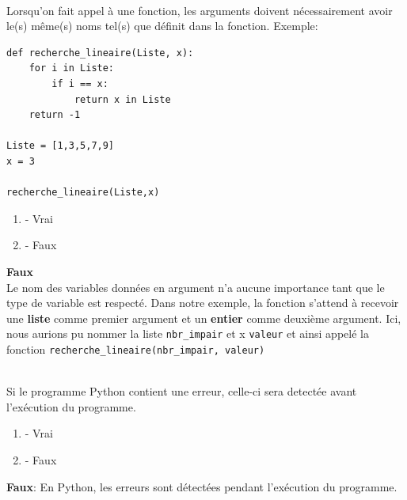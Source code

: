 \begin{Exercice}[2 minutes]\\
Lorsqu'on fait appel à une fonction, les arguments doivent nécessairement avoir le(s) même(s) noms tel(s) que définit dans la fonction. Exemple:\\
\begin{lstlisting}
def recherche_lineaire(Liste, x):
    for i in Liste:
        if i == x:
            return x in Liste
    return -1

Liste = [1,3,5,7,9]
x = 3

recherche_lineaire(Liste,x)

\end{lstlisting}
\begin{enumerate}[label=\Alph*]
    \item - Vrai
    \item - Faux
\end{enumerate}
\begin{solution}
    \textbf{Faux}\\
    Le nom des variables données en argument n'a aucune importance tant que le type de variable est respecté. Dans notre exemple, la fonction s'attend à recevoir  une \textbf{liste} comme premier argument et un \textbf{entier} comme deuxième argument. Ici, nous aurions pu nommer la liste \lstinline{nbr_impair} et x \lstinline{valeur} et ainsi appelé la fonction \lstinline{recherche_lineaire(nbr_impair, valeur)}

\end{solution}
\end{Exercice}

\begin{Exercice}[2 minutes]\\
Si le programme Python contient une erreur, celle-ci sera detectée avant l'exécution du programme. 

\begin{enumerate}[label=\Alph*]
    \item - Vrai
    \item - Faux
\end{enumerate}
\begin{solution}
    \textbf{Faux}: En Python, les erreurs sont détectées pendant l'exécution du programme.
\end{solution}
\end{Exercice}



